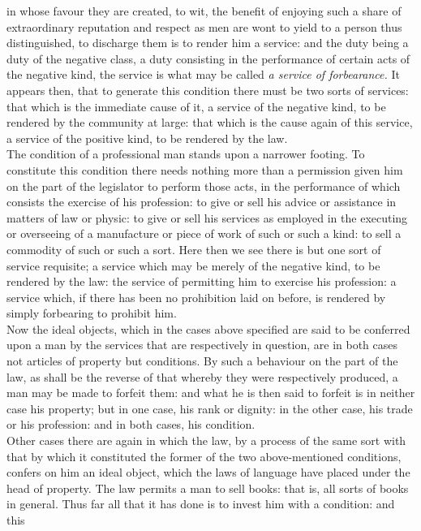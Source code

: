 \documentclass[12pt]{report}
\begin{document}
in whose favour they are created, to wit, the benefit of enjoying such a
share of extraordinary reputation and respect as men are wont to yield
to a person thus distinguished, to discharge them is to render him a
service: and the duty being a duty of the negative class, a duty
consisting in the performance of certain acts of the negative kind, the
service is what may be called \emph{a service of forbearance.} It
appears then, that to generate this condition there must be two sorts of
services: that which is the immediate cause of it, a service of the
negative kind, to be rendered by the community at large: that which is
the cause again of this service, a service of the positive kind, to be
rendered by the law.\\
The condition of a professional man stands upon a narrower footing. To
constitute this condition there needs nothing more than a permission
given him on the part of the legislator to perform those acts, in the
performance of which consists the exercise of his profession: to give or
sell his advice or assistance in matters of law or physic: to give or
sell his services as employed in the executing or overseeing of a
manufacture or piece of work of such or such a kind: to sell a commodity
of such or such a sort. Here then we see there is but one sort of
service requisite; a service which may be merely of the negative kind,
to be rendered by the law: the service of permitting him to exercise his
profession: a service which, if there has been no prohibition laid on
before, is rendered by simply forbearing to prohibit him.\\
Now the ideal objects, which in the cases above specified are said to be
conferred upon a man by the services that are respectively in question,
are in both cases not articles of property but conditions. By such a
behaviour on the part of the law, as shall be the reverse of that
whereby they were respectively produced, a man may be made to forfeit
them: and what he is then said to forfeit is in neither case his
property; but in one case, his rank or dignity: in the other case, his
trade or his profession: and in both cases, his condition.\\
Other cases there are again in which the law, by a process of the same
sort with that by which it constituted the former of the two
above-mentioned conditions, confers on him an ideal object, which the
laws of language have placed under the head of property. The law permits
a man to sell books: that is, all sorts of books in general. Thus far
all that it has done is to invest him with a condition: and this
\end{document}
